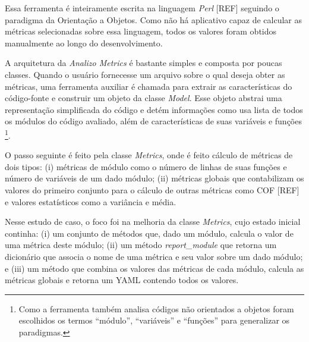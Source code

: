 Essa ferramenta é inteiramente escrita na linguagem \textit{Perl} [REF] seguindo o paradigma da
Orientação a Objetos. Como não há aplicativo capaz de calcular as métricas selecionadas
sobre essa linguagem, todos os valores foram obtidos manualmente ao longo do desenvolvimento.

A arquitetura da \textit{Analizo Metrics} é bastante simples e composta por poucas classes.
Quando o usuário fornecesse um arquivo sobre o qual deseja obter as métricas, uma ferramenta
auxiliar é chamada para extrair as características do código-fonte e construir um objeto da
classe \textit{Model}. Esse objeto abstrai uma representação simplificada do código e detém 
informações como usa lista de todos os módulos do código avaliado, além de características
de suas variáveis e funções \footnote{Como a ferramenta também analisa códigos não orientados
a objetos foram escolhidos os termos ``módulo'', ``variáveis'' e ``funções'' para generalizar os paradigmas.}.

O passo seguinte é feito pela classe \textit{Metrics}, onde é feito cálculo de métricas de dois 
tipos: (i) métricas de módulo como o número de linhas de suas funções e número de variáveis de
um dado módulo; (ii) métricas globais que contabilizam os valores do primeiro conjunto para o
cálculo de outras métricas como COF [REF] e valores estatísticos como a variância e média.

Nesse estudo de caso, o foco foi na melhoria da classe \textit{Metrics}, cujo estado inicial continha:
(i) um conjunto de métodos que, dado um módulo, calcula o valor de uma métrica deste módulo;
(ii) um método \textit{report_module} que retorna um dicionário que associa o nome de uma métrica
e seu valor sobre um dado módulo; e (iii) um método  que combina os valores das métricas
de cada módulo, calcula as métricas globais e retorna um YAML contendo todos os valores.

